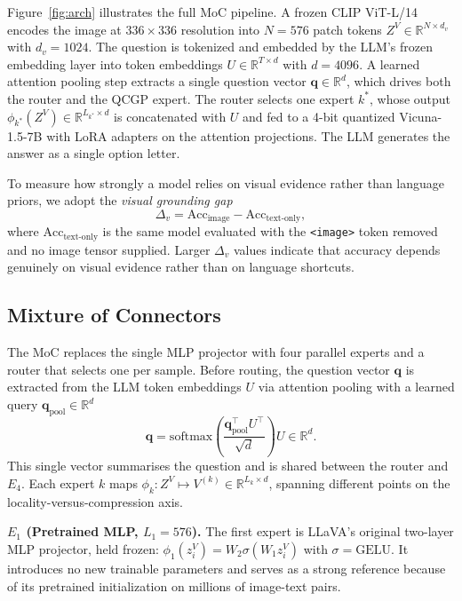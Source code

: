 \documentclass{article}
\begin{document}
Figure~\ref{fig:arch} illustrates the full MoC pipeline. A frozen CLIP ViT-L/14 encodes the image at $336 \times 336$ resolution into $N=576$ patch tokens $Z^V \in \mathbb{R}^{N \times d_v}$ with $d_v=1024$. The question is tokenized and embedded by the LLM's frozen embedding layer into token embeddings $U \in \mathbb{R}^{T \times d}$ with $d=4096$. A learned attention pooling step extracts a single question vector $\mathbf{q} \in \mathbb{R}^d$, which drives both the router and the QCGP expert. The router selects one expert $k^*$, whose output $\phi_{k^*}(Z^V) \in \mathbb{R}^{L_{k^*} \times d}$ is concatenated with $U$ and fed to a 4-bit quantized Vicuna-1.5-7B with LoRA adapters on the attention projections. The LLM generates the answer as a single option letter.

To measure how strongly a model relies on visual evidence rather than language priors, we adopt the \emph{visual grounding gap}
\begin{equation*}
    \Delta_v = \text{Acc}_{\text{image}} - \text{Acc}_{\text{text-only}},
\end{equation*}
where $\text{Acc}_{\text{text-only}}$ is the same model evaluated with the \texttt{<image>} token removed and no image tensor supplied. Larger $\Delta_v$ values indicate that accuracy depends genuinely on visual evidence rather than on language shortcuts.

\subsection{Mixture of Connectors}
\label{sec:method-moc}

The MoC replaces the single MLP projector with four parallel experts and a router that selects one per sample. Before routing, the question vector $\mathbf{q}$ is extracted from the LLM token embeddings $U$ via attention pooling with a learned query $\mathbf{q}_{\text{pool}} \in \mathbb{R}^d$
\begin{equation*}
    \mathbf{q} = \mathrm{softmax}\!\left(\frac{\mathbf{q}_{\text{pool}}^\top U^\top}{\sqrt{d}}\right) U \in \mathbb{R}^{d}.
\end{equation*}
This single vector summarises the question and is shared between the router and $E_4$. Each expert $k$ maps $\phi_k\colon Z^V \mapsto V^{(k)} \in \mathbb{R}^{L_k \times d}$, spanning different points on the locality-versus-compression axis.

\textbf{$E_1$ (Pretrained MLP, $L_1 = 576$).} The first expert is LLaVA's original two-layer MLP projector, held frozen: $\phi_1(z_i^V) = W_2 \sigma(W_1 z_i^V)$ with $\sigma=\text{GELU}$. It introduces no new trainable parameters and serves as a strong reference because of its pretrained initialization on millions of image-text pairs.
\end{document}

